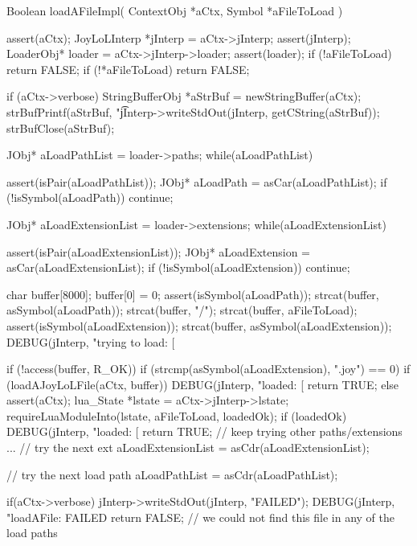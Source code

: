 \startCCode
Boolean loadAFileImpl(
  ContextObj *aCtx,
  Symbol     *aFileToLoad
) {
  assert(aCtx);
  JoyLoLInterp *jInterp = aCtx->jInterp;
  assert(jInterp);
  LoaderObj* loader = aCtx->jInterp->loader;
  assert(loader);
  if (!aFileToLoad) return FALSE;
  if (!*aFileToLoad) return FALSE;

  if (aCtx->verbose) {
    StringBufferObj *aStrBuf = newStringBuffer(aCtx);
    strBufPrintf(aStrBuf, "\t%
    jInterp->writeStdOut(jInterp, getCString(aStrBuf));
    strBufClose(aStrBuf);
  }

  JObj* aLoadPathList = loader->paths;
  while(aLoadPathList) {
    assert(isPair(aLoadPathList));
    JObj* aLoadPath = asCar(aLoadPathList);
    if (!isSymbol(aLoadPath)) continue;

    JObj* aLoadExtensionList = loader->extensions;
    while(aLoadExtensionList) {
      assert(isPair(aLoadExtensionList));
      JObj* aLoadExtension = asCar(aLoadExtensionList);
      if (!isSymbol(aLoadExtension)) continue;

      char buffer[8000];
      buffer[0] = 0;
      assert(isSymbol(aLoadPath));
      strcat(buffer, asSymbol(aLoadPath));
      strcat(buffer, "/");
      strcat(buffer, aFileToLoad);
      assert(isSymbol(aLoadExtension));
      strcat(buffer, asSymbol(aLoadExtension));
      DEBUG(jInterp, "trying to load: [%

      if (!access(buffer, R_OK)) {
        if (strcmp(asSymbol(aLoadExtension), ".joy") == 0) {
          if (loadAJoyLoLFile(aCtx, buffer)) {
            DEBUG(jInterp, "loaded: [%
            return TRUE;
          }
        } else {
          assert(aCtx);
          lua_State *lstate = aCtx->jInterp->lstate;
          requireLuaModuleInto(lstate, aFileToLoad, loadedOk);
          if (loadedOk) {
            DEBUG(jInterp, "loaded: [%
            return TRUE;
          }
        }
        // keep trying other paths/extensions ...
      }
      // try the next ext
      aLoadExtensionList = asCdr(aLoadExtensionList);
    }
    // try the next load path
    aLoadPathList = asCdr(aLoadPathList);
  }
  if(aCtx->verbose) {
    jInterp->writeStdOut(jInterp, "FAILED\n");
  }
  DEBUG(jInterp, "loadAFile: FAILED%
  return FALSE; // we could not find this file in any of the load paths
}
\stopCCode


